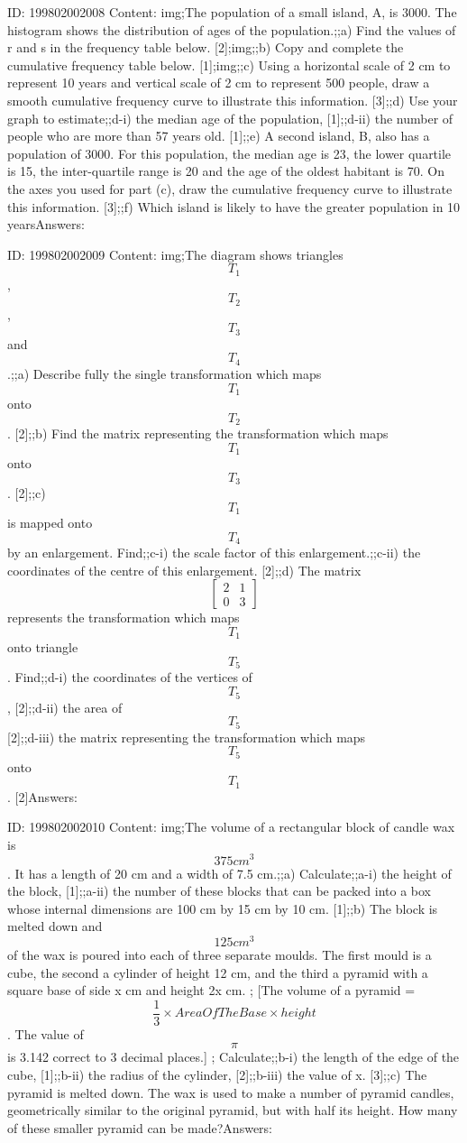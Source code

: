 \documentclass{article}
\begin{document}
ID: 199802002008
Content:
img;The population of a small island, A, is 3000. The histogram shows the distribution of ages of the population.;;a) Find the values of r and s in the frequency table below. [2];img;;b) Copy and complete the cumulative frequency table below. [1];img;;c) Using a horizontal scale of 2 cm to represent 10 years and vertical scale of 2 cm to represent 500 people, draw a smooth cumulative frequency curve to illustrate this information. [3];;d) Use your graph to estimate;;d-i) the median age of the population, [1];;d-ii) the number of people who are more than 57 years old. [1];;e) A second island, B, also has a population of 3000. For this population, the median age is 23, the lower quartile is 15, the inter-quartile range is 20 and the age of the oldest habitant is 70. On the axes you used for part (c), draw the cumulative frequency curve to illustrate this information. [3];;f) Which island is likely to have the greater population in 10 yearsAnswers:

ID: 199802002009
Content:
img;The diagram shows triangles $$T_1$$, $$T_2$$, $$T_3$$ and $$T_4$$.;;a) Describe fully the single transformation which maps $$T_1$$ onto $$T_2$$. [2];;b) Find the matrix representing the transformation which maps $$T_1$$ onto $$T_3$$. [2];;c) $$T_1$$ is mapped onto $$T_4$$ by an enlargement. Find;;c-i) the scale factor of this enlargement.;;c-ii) the coordinates of the centre of this enlargement. [2];;d) The matrix $$\begin{bmatrix}2&1\\0&3\end{bmatrix}$$ represents the transformation which maps $$T_1$$ onto triangle $$T_5$$. Find;;d-i) the coordinates of the vertices of $$T_5$$, [2];;d-ii) the area of $$T_5$$ [2];;d-iii) the matrix representing the transformation which maps $$T_5$$ onto $$T_1$$. [2]Answers:

ID: 199802002010
Content:
img;The volume of a rectangular block of candle wax is $$375cm^{3} $$. It has a length of 20 cm and a width of 7.5 cm.;;a) Calculate;;a-i) the height of the block, [1];;a-ii) the number of these blocks that can be packed into a box whose internal dimensions are 100 cm by 15 cm by 10 cm. [1];;b) The block is melted down and $$125cm^{3} $$ of the wax is poured into each of three separate moulds. The first mould is a cube, the second a cylinder of height 12 cm, and the third a pyramid with a square base of side x cm and height 2x cm.  ; [The volume of a pyramid = $$\frac{1}{3} \times Area Of The Base \times height$$. The value of $$\pi$$ is 3.142 correct to 3 decimal places.] ; Calculate;;b-i) the length of the edge of the cube, [1];;b-ii) the radius of the cylinder, [2];;b-iii) the value of x. [3];;c) The pyramid is melted down. The wax is used to make a number of pyramid candles, geometrically similar to the original pyramid, but with half its height. How many of these smaller pyramid can be made?Answers:
\end{document}
